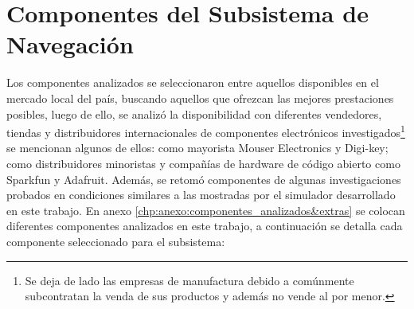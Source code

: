 \section{Componentes del Subsistema de Navegación}
 
Los componentes analizados se seleccionaron entre aquellos disponibles en el mercado local del país, buscando aquellos que ofrezcan las mejores prestaciones posibles, luego de ello,  se analizó la disponibilidad con diferentes vendedores, tiendas  y distribuidores internacionales de componentes electrónicos investigados\footnote{Se deja de lado las empresas de manufactura debido a comúnmente subcontratan la venda de sus productos y además no vende al por menor.} se mencionan algunos de ellos: como mayorista Mouser Electronics y Digi-key; como distribuidores minoristas y compañías de hardware de código abierto como Sparkfun y Adafruit. Además, se retomó componentes de algunas investigaciones  probados en condiciones similares a las mostradas por el simulador desarrollado en este trabajo.  En anexo \ref{chp:anexo:componentes_analizados&extras} se colocan diferentes componentes analizados en este trabajo, a continuación se detalla cada componente seleccionado para el subsistema:

